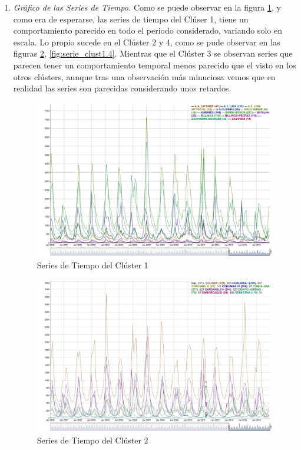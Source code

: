 \documentclass[12pt,oneside]{book}\usepackage[]{graphicx}\usepackage[]{color}
\theoremstyle{definition} %
\begin{document}
\begin{enumerate}
\item \textit{Gráfico de las Series de Tiempo.} Como se puede observar en la figura \ref{fig:serie_clust1.1}, y como era de esperarse, las series de tiempo del Clúser 1, tiene un comportamiento parecido en todo el periodo considerado, variando solo en escala. Lo propio sucede en el Clúster 2 y 4, como se pude observar en las figuras \ref{fig:serie_clust1.2}, \ref{fig:serie_clust1.4}. Mientras que el Clúster 3 se observan series que parecen tener un comportamiento temporal menos parecido que el visto en los otros clústers, aunque tras una observación más minuciosa vemos que en realidad las series son parecidas considerando unos retardos.
\begin{figure}[H]
\centering
\includegraphics[scale=0.4]{Resultados/Cluster1/1_series_cluster}
\caption{Series de Tiempo del Clúster 1}\label{fig:serie_clust1.1}
\end{figure}


\begin{figure}[H]
\centering
\includegraphics[scale=0.5]{Resultados/Cluster2/1_series_cluster}
\caption{Series de Tiempo del Clúster 2}\label{fig:serie_clust1.2}
\end{figure}


\end{enumerate}
\end{document}
